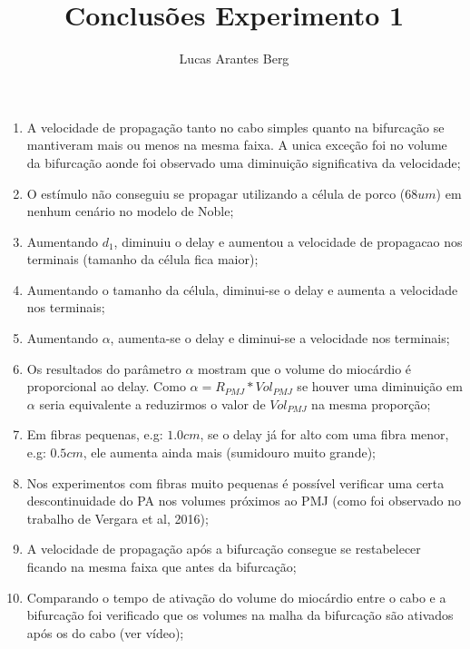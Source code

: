 \documentclass[]{article}
\title{Conclusões Experimento 1}
\author{Lucas Arantes Berg}
\begin{document}
	
	\maketitle
	
	\begin{enumerate}
		
		\item A velocidade de propagação tanto no cabo simples quanto na bifurcação se mantiveram mais ou menos na mesma faixa. A unica exceção foi no volume da bifurcação aonde foi observado uma diminuição significativa da velocidade;
		
		\item O estímulo não conseguiu se propagar utilizando a célula de porco ($68 um$) em nenhum cenário no modelo de Noble;
		
		\item Aumentando $d_1$, diminuiu o delay e aumentou a velocidade de propagacao nos terminais (tamanho da célula fica maior);
		
		\item  Aumentando o tamanho da célula, diminui-se o delay e aumenta a velocidade nos terminais;
		
		\item Aumentando $\alpha$, aumenta-se o delay e diminui-se a velocidade nos terminais;
		
		\item Os resultados do parâmetro $\alpha$ mostram que o volume do miocárdio é proporcional ao delay. Como $\alpha = R_{PMJ}*Vol_{PMJ}$ se houver uma diminuição em $\alpha$ seria equivalente a reduzirmos o valor de $Vol_{PMJ}$ na mesma proporção;
		
		\item Em fibras pequenas, e.g: $1.0 cm$, se o delay já for alto com uma fibra menor, e.g: $0.5 cm$, ele aumenta ainda mais (sumidouro muito grande);
		
		\item Nos experimentos com fibras muito pequenas é possível verificar uma certa descontinuidade do PA nos volumes próximos ao PMJ (como foi observado no trabalho de Vergara et al, 2016);
		
		\item A velocidade de propagação após a bifurcação consegue se restabelecer ficando na mesma faixa que antes da bifurcação;
		
		\item Comparando o tempo de ativação do volume do miocárdio entre o cabo e a bifurcação foi verificado que os volumes na malha da bifurcação são ativados após os do cabo (ver vídeo);
		

\end{enumerate}
\end{document}
